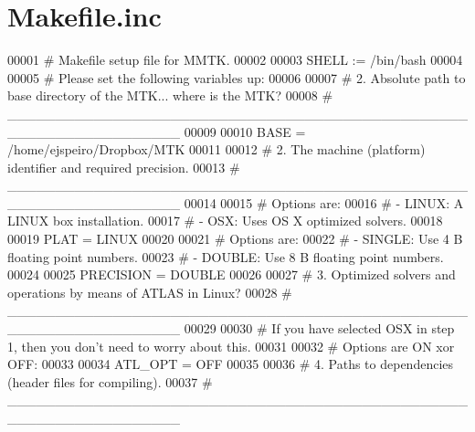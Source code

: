 \hypertarget{Makefile_8inc_source}{\section{Makefile.\-inc}
}

\begin{DoxyCode}
00001 \textcolor{preprocessor}{# Makefile setup file for MMTK.}
00002 \textcolor{preprocessor}{}
00003 SHELL := /bin/bash
00004 
00005 \textcolor{preprocessor}{# Please set the following variables up:}
00006 \textcolor{preprocessor}{}
00007 \textcolor{preprocessor}{#   2. Absolute path to base directory of the MTK... where is the MTK?}
00008 \textcolor{preprocessor}{}\textcolor{preprocessor}{#   \_\_\_\_\_\_\_\_\_\_\_\_\_\_\_\_\_\_\_\_\_\_\_\_\_\_\_\_\_\_\_\_\_\_\_\_\_\_\_\_\_\_\_\_\_\_\_\_\_\_\_\_\_\_\_\_\_\_\_\_\_\_\_\_\_\_}
00009 \textcolor{preprocessor}{}
00010 BASE = /home/ejspeiro/Dropbox/MTK
00011 
00012 \textcolor{preprocessor}{#   2. The machine (platform) identifier and required precision.}
00013 \textcolor{preprocessor}{}\textcolor{preprocessor}{#   \_\_\_\_\_\_\_\_\_\_\_\_\_\_\_\_\_\_\_\_\_\_\_\_\_\_\_\_\_\_\_\_\_\_\_\_\_\_\_\_\_\_\_\_\_\_\_\_\_\_\_\_\_\_\_\_\_\_\_\_\_\_\_\_\_\_}
00014 \textcolor{preprocessor}{}
00015 \textcolor{preprocessor}{# Options are:}
00016 \textcolor{preprocessor}{}\textcolor{preprocessor}{# - LINUX: A LINUX box installation.}
00017 \textcolor{preprocessor}{}\textcolor{preprocessor}{# - OSX: Uses OS X optimized solvers.}
00018 \textcolor{preprocessor}{}
00019 PLAT = LINUX
00020 
00021 \textcolor{preprocessor}{# Options are:}
00022 \textcolor{preprocessor}{}\textcolor{preprocessor}{# - SINGLE: Use 4 B floating point numbers.}
00023 \textcolor{preprocessor}{}\textcolor{preprocessor}{# - DOUBLE: Use 8 B floating point numbers.}
00024 \textcolor{preprocessor}{}
00025 PRECISION = DOUBLE
00026 
00027 \textcolor{preprocessor}{#   3. Optimized solvers and operations by means of ATLAS in Linux?}
00028 \textcolor{preprocessor}{}\textcolor{preprocessor}{#   \_\_\_\_\_\_\_\_\_\_\_\_\_\_\_\_\_\_\_\_\_\_\_\_\_\_\_\_\_\_\_\_\_\_\_\_\_\_\_\_\_\_\_\_\_\_\_\_\_\_\_\_\_\_\_\_\_\_\_\_\_\_\_\_\_\_}
00029 \textcolor{preprocessor}{}
00030 \textcolor{preprocessor}{# If you have selected OSX in step 1, then you don't need to worry about this.}
00031 \textcolor{preprocessor}{}
00032 \textcolor{preprocessor}{# Options are ON xor OFF:}
00033 \textcolor{preprocessor}{}
00034 ATL\_OPT = OFF
00035 
00036 \textcolor{preprocessor}{#   4. Paths to dependencies (header files for compiling).}
00037 \textcolor{preprocessor}{}\textcolor{preprocessor}{#   \_\_\_\_\_\_\_\_\_\_\_\_\_\_\_\_\_\_\_\_\_\_\_\_\_\_\_\_\_\_\_\_\_\_\_\_\_\_\_\_\_\_\_\_\_\_\_\_\_\_\_\_\_\_\_\_\_\_\_\_\_\_\_\_\_\_}

\end{DoxyCode}
